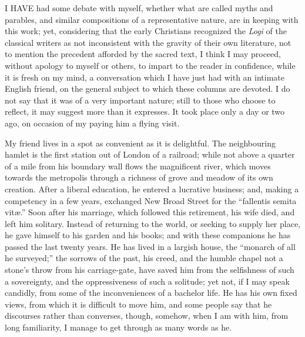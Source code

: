 
I HAVE had some debate with myself,
whether what are called myths and parables, and similar compositions
of a representative nature, are in keeping with this work; yet,
considering that the early Christians recognized the \emph{Logi} of
the classical writers as not inconsistent with the gravity of their
own literature, not to mention the precedent afforded by the sacred
text, I think I may proceed, without apology to myself or others, to
impart to the reader in confidence, while it is fresh on my mind, a
conversation which I have just had with an intimate English friend, on
the general subject to which these columns are devoted. I do not say
that it was of a very important nature; still to those who choose to
reflect, it may suggest more than it expresses. It took place only a
day or two ago, on occasion of my paying him a flying visit.

My friend lives in a spot as convenient as it is delightful. The
neighbouring hamlet is the first station out of London of a railroad;
while not above a quarter of a mile from his boundary wall flows the
magnificent river, which moves towards the metropolis through a
richness of grove and meadow of its own creation. After a liberal
education, he entered a lucrative business; and, making a competency
in a few years, exchanged New Broad Street for the ``fallentis
semita vitæ.'' Soon after his marriage, which followed this
retirement, his wife died, and left him solitary. Instead of returning
to the world, or seeking to supply her place, he gave himself to his
garden and his books; and with these companions he has passed the last
twenty years. He has lived in a largish house, the ``monarch of
all he surveyed;'' the sorrows of the past, his creed, and the
humble chapel not a stone's throw from his carriage-gate, have saved
him from the selfishness of such a sovereignty, and the oppressiveness
of such a solitude; yet not, if I may speak candidly, from some of the
inconveniences of a bachelor life. He has his own fixed views, from
which it is difficult to move him, and some people say that he
discourses rather than converses, though, somehow, when I am with him,
from long familiarity, I manage to get through as many words as he.

